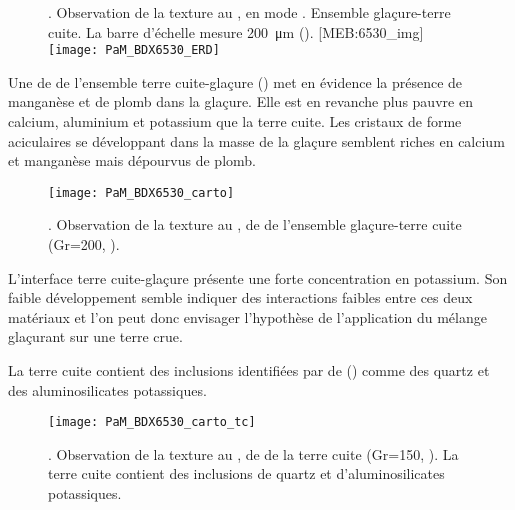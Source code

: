 \begin{figure}[htb]
  \setlength{\imgwidth}{7cm}
  \setlength{\mylength}{1cm+\imgwidth}
  \setlength{\sidecapwidth}{\linewidth-\sidecapsep-\mylength-1cm}
  \renewcommand*{\sidecapfloatwidth}{\mylength}%
  \RaggedLeft
  \begin{sidecaption}{%
    \legendeC.
    Observation de la texture au \MEB, en mode \ERD. 
    Ensemble glaçure-terre cuite. La barre d'échelle mesure 
    \SI{200}{\um} ().%
  }[MEB:6530_img]
    \texttt{[image: PaM\_BDX6530\_ERD]}%
  \end{sidecaption}
\end{figure}

Une \carto de \RX de l'ensemble terre cuite-glaçure 
() met en évidence la présence de 
manganèse et de plomb dans la glaçure. Elle est en revanche plus 
pauvre en calcium, aluminium et potassium que la terre cuite. Les 
cristaux de forme aciculaires se développant dans la masse de la 
glaçure semblent riches en calcium et manganèse mais dépourvus de 
plomb.

\begin{figure}[htb]
  \texttt{[image: PaM\_BDX6530\_carto]}%
  \caption[\ -- Observation de la texture au \MEB, 
           \carto de \RX de l'ensemble glaçure-terre cuite]
          {\legendeC.
           Observation de la texture au \MEB, 
           \carto de \RX de l'ensemble glaçure-terre cuite 
           (Gr=200, ).}
  \label{MEB:6530_carto_tcgla}
\end{figure}

L'interface terre cuite-glaçure présente une forte concentration en 
potassium. Son faible développement semble indiquer des interactions 
faibles entre ces deux matériaux et l'on peut donc envisager 
l'hypothèse de l'application du mélange glaçurant sur une terre crue.

La terre cuite contient des inclusions identifiées par \carto de \RX 
() comme des quartz et des aluminosilicates 
potassiques.

\begin{figure}[htb]
  \texttt{[image: PaM\_BDX6530\_carto\_tc]}%
  \caption[\ -- Observation de la texture au \MEB, 
           \carto de \RX de la terre cuite]
          {\legendeC.
           Observation de la texture au \MEB, 
           \carto de \RX de la terre cuite 
           (Gr=150, ). La terre cuite contient des 
           inclusions de quartz et d'aluminosilicates potassiques.}
  \label{MEB:6530_carto_tc}
\end{figure}


